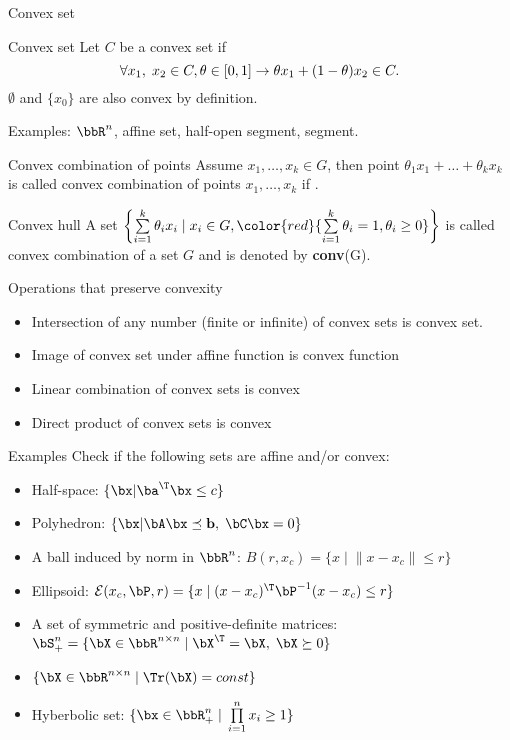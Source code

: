 \documentclass[12pt,russian]{beamer}
\begin{document}
\begin{frame}{Convex set}
\small
\begin{block}{Convex set}
Let $C$ be a convex set if 
\vspace{-4mm}
\[
\forall x_1, \; x_2 \in C, \theta \in [0, 1] \rightarrow \theta x_1 + (1 - \theta)x_2 \in C.
\vspace{-4mm}
\]
$\emptyset$ and $\{ x_0 \}$ are also convex by definition.
\end{block}
Examples: $\bbR^n$, affine set, half-open segment, segment.

\begin{block}{Convex combination of points}
Assume $x_1, \ldots, x_k \in G$, then point $\theta_1 x_1 + \ldots + \theta_k x_k$ is called convex combination of points $x_1,\ldots,x_k$ if {}.
\end{block}

\begin{block}{Convex hull}
A set $\left\{ \sum\limits_{i=1}^k \theta_i x_i \; | \; x_i \in G, {\color{red}{\sum\limits_{i=1}^k \theta_i = 1, \theta_i \geq 0}} \right\}$ is called convex combination of a set $G$ and is denoted by \textbf{conv}(G).
\end{block}

\end{frame}

\begin{frame}{Operations that preserve convexity}
\begin{itemize}
\item Intersection of any number (finite or infinite) of convex sets is convex set.
\item Image of convex set under affine function is convex function
\item Linear combination of convex sets is convex
\item Direct product of convex sets is convex
\end{itemize}
\end{frame}

\begin{frame}{Examples}
Check if the following sets are affine and/or convex:
\begin{itemize}
\item Half-space: $\{ \bx | \ba^{\T} \bx \leq c \}$
\item Polyhedron: $\{ \bx | \bA\bx \preceq \mathbf{b}, \; \bC\bx = 0 \}$
\item A ball induced by norm in $\bbR^n$: $B(r, x_c) = \{ x \; | \; \| x - x_c \| \leq r \}$
\item Ellipsoid: $\mathcal{E}(x_c, \bP, r) = \{ x \; | \; (x - x_c)^{\T}\bP^{-1} (x - x_c) \leq r \}$
\item A set of symmetric and positive-definite matrices: $\bS^n_+ = \{ \bX \in \bbR^{n \times n} \; | \; \bX^{\T} = \bX, \; \bX \succeq 0 \}$
\item $\{ \bX \in \bbR^{n \times n} \; | \; \Tr(\bX) = const \}$
\item Hyberbolic set: $\{ \bx \in \bbR^n_+ \; | \; \prod\limits_{i=1}^n x_i \geq 1 \}$
\end{itemize}
\end{frame}
\end{document}
